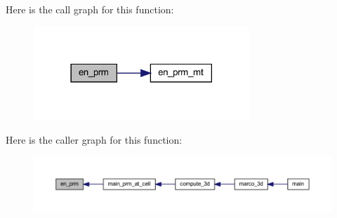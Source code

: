 Here is the call graph for this function\+:
\nopagebreak
\begin{figure}[H]
\begin{center}
\leavevmode
\includegraphics[width=230pt]{Marco_8f90_aa315629893313c49aa9f1836084f80b6_cgraph}
\end{center}
\end{figure}
Here is the caller graph for this function\+:
\nopagebreak
\begin{figure}[H]
\begin{center}
\leavevmode
\includegraphics[width=350pt]{Marco_8f90_aa315629893313c49aa9f1836084f80b6_icgraph}
\end{center}
\end{figure}
\mbox{\label{Marco_8f90_a18b8a51feece5566bf2eabdfec68c2b3}} 
